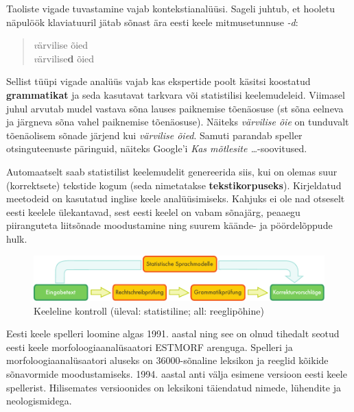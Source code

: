 \begin{multicols}{2}
Taoliste vigade tuvastamine vajab kontekstianalüüsi. 
Sageli juhtub, et hooletu näpulöök klaviatuuril jätab sõnast ära eesti keele mitmusetunnuse \textit{-d}: 

\begin{quote}
 \textit värvilise õied\\ 
 \textit värvilise\textbf{d} õied
\end{quote}

Sellist tüüpi vigade analüüs vajab kas ekspertide poolt käsitsi koostatud \textbf{grammatikat} ja seda kasutavat tarkvara või statistilisi keelemudeleid. 
Viimasel juhul arvutab mudel vastava sõna lauses paiknemise tõenäosuse (st sõna eelneva ja järgneva sõna vahel paiknemise tõenäosuse). 
Näiteks \textit{värvilise õie} on tunduvalt tõenäolisem sõnade järjend kui \textit{värvilise õied}. 
Samuti parandab speller otsinguteenuste päringuid, näiteks Google’i \textit{Kas mõtlesite …}-soovitused.

Automaatselt saab statistilist keelemudelit genereerida siis, kui on olemas suur (korrektsete) tekstide kogum (seda nimetatakse \textbf{tekstikorpuseks}). 
Kirjeldatud meetodeid on kasutatud inglise keele analüüsimiseks. 
Kahjuks ei ole nad otseselt eesti keelele ülekantavad, sest eesti keelel on vabam sõnajärg, peaaegu piiranguteta liitsõnade moodustamine ning suurem käände- ja pöördelõppude hulk. 




\begin{figure}[htb]
  \center
  \includegraphics[width=\textwidth]{../_media/german/language_checking}
  \caption{Keeleline kontroll (üleval: statistiline; all: reeglipõhine)}
  \label{fig:langcheckingaarch_ee}
\end{figure}

Eesti keele spelleri loomine algas 1991. aastal ning see on olnud tihedalt seotud eesti keele morfoloogiaanalüsaatori ESTMORF arenguga. 
Spelleri ja morfoloogiaanalüsaatori aluseks on 36000-sõnaline leksikon ja reeglid kõikide sõnavormide moodustamiseks. 
1994. aastal anti välja esimene versioon eesti keele spellerist. Hilisemates versioonides on leksikoni täiendatud nimede, lühendite ja neologismidega.


\end{multicols}
